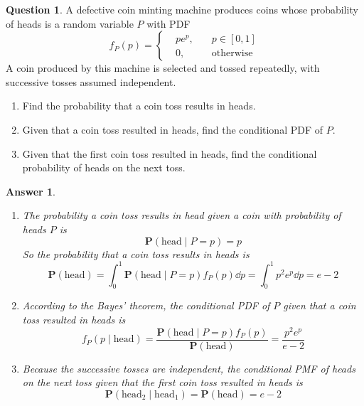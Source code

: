 \documentclass[utf8]{article}
\theoremstyle{definition}%
\newtheorem{question}{Question} %
\theoremstyle{plain}%
\newtheorem{answer}{Answer} %
\begin{document}
\begin{question}
    A defective coin minting machine produces coins whose probability of heads is a random variable $P$ with PDF
    \begin{equation}
        f_{P}(p) = \left\{\begin{aligned}
            &p e^p, \quad &p \in [0, 1] \\ 
            &0, \quad &\text{otherwise}
        \end{aligned}\right.
    \end{equation}
    A coin produced by this machine is selected and tossed repeatedly, with successive tosses assumed independent.
    \begin{enumerate}[label=(\alph*)]
        \item Find the probability that a coin toss results in heads.
        \item Given that a coin toss resulted in heads, find the conditional PDF of $P$.
        \item Given that the first coin toss resulted in heads, find the conditional probability of heads on the next toss.
    \end{enumerate}
\end{question} 
\begin{answer} ~
    \begin{enumerate}[label=(\alph*)]
        \item The probability a coin toss results in head given a coin with probability of heads $P$ is
        \begin{equation}
            \mathbf{P}(\text{head} \mid P = p) = p
        \end{equation}
        So the probability that a coin toss results in heads is
        \begin{equation}
            \mathbf{P}(\text{head}) = \int_{0}^{1} \mathbf{P}(\text{head} \mid P = p)f_{P}(p) \dd{p} = \int_{0}^{1} p^2 e^p \dd{p} = e - 2
        \end{equation}
        \item According to the Bayes' theorem, the conditional PDF of $P$ given that a coin toss resulted in heads is
        \begin{equation}
            f_{P}(p \mid \text{head}) = \frac{\mathbf{P}(\text{head} \mid P = p)f_{P}(p)}{\mathbf{P}(\text{head})} = \frac{p^2 e^p}{e - 2}
        \end{equation}
        \item Because the successive tosses are independent, the conditional PMF of heads on the next toss given that the first coin toss resulted in heads is
        \begin{equation}
            \mathbf{P}(\text{head}_2 \mid \text{head}_1) = \mathbf{P}(\text{head}) = e - 2
        \end{equation}
    \end{enumerate}
\end{answer}
\end{document}
